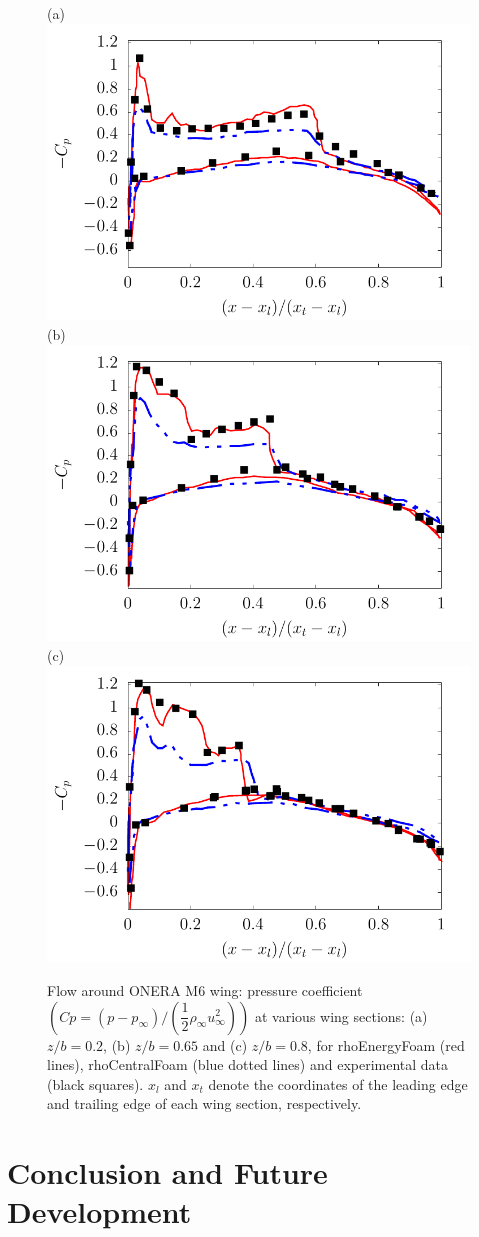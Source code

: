 \documentclass[a5paper]{sapthesis}
\begin{document}
	\begin{figure}[h]
		\begin{center}
			(a)\includegraphics[width=0.45\linewidth]{Figures/Cp_oneram6_02}
			(b)\includegraphics[width=0.45\linewidth]{Figures/Cp_oneram6_065}\\
			\vspace{3mm}
			(c)\includegraphics[width=0.45\linewidth]{Figures/Cp_oneram6_08}
			\caption[Pressure coefficient of the flow around ONERA M6 wing.]{Flow around ONERA M6 wing: pressure coefficient $(Cp = (p-p_\infty)/(\dfrac{1}{2}\rho_\infty u^2_\infty))$ at various wing sections: (a) $z/b = 0.2$, (b) $z/b = 0.65$ and (c) $z/b = 0.8$, for rhoEnergyFoam (red lines), rhoCentralFoam (blue dotted lines) and experimental data (black squares). $x_l$ and $x_t$ denote the coordinates of the leading edge and trailing edge of each wing section, respectively.}
			\label{Cp_oneraM6}
		\end{center}
	\end{figure}
	
	\chapter{Conclusion and Future Development}
	\label{chap:conclusion}
	
\end{document}
